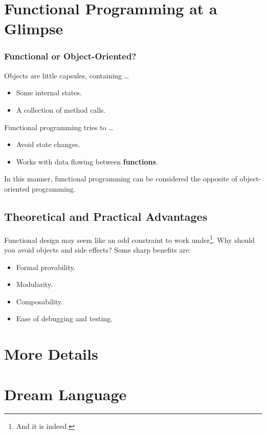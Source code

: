 \documentclass[12pt,hyperref=true,mathserif]{beamer}
\begin{document}
\section{Functional Programming at a Glimpse}


\begin{frame}
  \frametitle{Functional or Object-Oriented?}
  Objects are little capsules, containing \ldots
  \begin{itemize}
    \item Some internal states.
    \item A collection of method calls.\\[6pt]
  \end{itemize}
  Functional programming tries to \ldots
  \begin{itemize}
    \item Avoid state changes.
    \item Works with data flowing between \textbf{functions}.\\[4pt]
  \end{itemize}
  In this manner, functional programming can be considered the
  opposite of object-oriented programming.
\end{frame}

\subsection{Theoretical and Practical Advantages}


\begin{frame}
Functional design may seem like an odd constraint to work
under\footnote{And it is indeed.}. Why should you avoid objects and
side effects? Some sharp benefits are:
\begin{itemize}
  \item Formal provability.\\[4pt]
  \item Modularity.\\[4pt]
  \item Composability.\\[4pt]
  \item Ease of debugging and testing.\\[4pt]
\end{itemize}
\end{frame}



\section{More Details}


\begin{frame}
  
\end{frame}

\section{Dream Language}


\begin{frame}
% 
% 
\end{frame}
\end{document}
